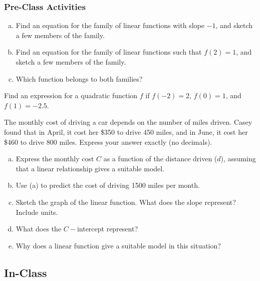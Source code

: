\documentclass[notes]{subfiles}
\begin{document}
	\subsubsection*{Pre-Class Activities}
		\begin{ex}
			\begin{enumerate}[(a)]
				\item Find an equation for the family of linear functions with slope $-1$, and sketch a few members of the family.
					
				\item Find an equation for the family of linear functions such that $f(2) = 1$, and sketch a few members of the family.
					
				\item Which function belongs to both families?
			\end{enumerate}
		\end{ex}
			\newpage
			
		\begin{ex}
			Find an expression for a quadratic function $f$ if $f(-2) = 2$, $f(0) = 1$, and $f(1) = -2.5$.
		\end{ex}
			\vs{1}
			
		\begin{ex}
			The monthly cost of driving a car depends on the number of miles driven.  Casey found that in April, it cost her \$350 to drive 450 miles, and in June, it cost her \$460 to drive 800 miles.  Express your answer exactly (no decimals).
			\begin{enumerate}[(a)]
				\item Express the monthly cost $C$ as a function of the distance driven ($d$), assuming that a linear relationship gives a suitable model.
					\vs{.5}
				\item Use (a) to predict the cost of driving 1500 miles per month.
					\vs{.5}
				\item Sketch the graph of the linear function.  What does the slope represent?  Include units.
					\vs{1}
				\item What does the $C-$intercept represent?
					\vs{.5}
				\item Why does a linear function give a suitable model in this situation?
					\vs{.5}
			\end{enumerate}
		\end{ex}
	 		\newpage
	 		
	\subsection*{In-Class} 
\end{document}
